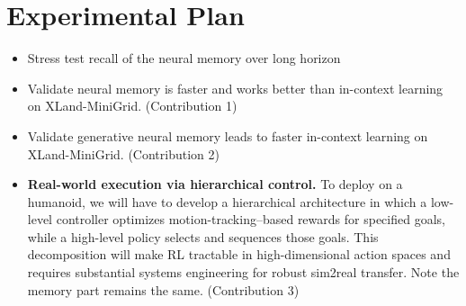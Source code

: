 \section{Experimental Plan}

\begin{itemize}
    \item Stress test recall of the neural memory over long horizon
    \item Validate neural memory is faster and works better than in-context learning on XLand-MiniGrid. (Contribution 1)
    \item Validate generative neural memory leads to faster in-context learning on XLand-MiniGrid. (Contribution 2)
    \item \textbf{Real-world execution via hierarchical control.} To deploy on a humanoid, we will have to develop a hierarchical architecture in which a low-level controller optimizes motion-tracking--based rewards for specified goals, while a high-level policy selects and sequences those goals. This decomposition will make RL tractable in high-dimensional action spaces and requires substantial systems engineering for robust sim2real transfer. Note the memory part remains the same. (Contribution 3)

\end{itemize}